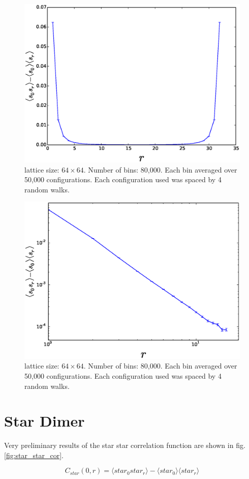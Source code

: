 \documentclass[aps,floatfix,11pt]{revtex4-1}
\begin{document}
\begin{figure}[h]
    \centering
    \includegraphics[width=8.5 cm]{dimer_dimer_cor}
    \caption{lattice size: $64\times64$. Number of bins: 80,000. Each bin averaged over 50,000
    configurations. Each configuration used was spaced by 4 random walks.\label{fig:dimer_dimer_cor}}
\end{figure}

\begin{figure}[h]
    \centering
    \includegraphics[width=8.5 cm]{dimer_dimer_cor_log}
    \caption{lattice size: $64\times64$. Number of bins: 80,000. Each bin averaged over 50,000
    configurations. Each configuration used was spaced by 4 random walks.\label{fig:dimer_dimer_cor_log}}
\end{figure}

\section{Star Dimer}

Very preliminary results of the star star correlation function are shown in fig.
\ref{fig:star_star_cor}. 

\begin{equation}
    \label{}
    C_{star}(0,r) =  \langle star_0 star_r \rangle -\langle star_0 \rangle \langle star_r \rangle
\end{equation}
\end{document}
